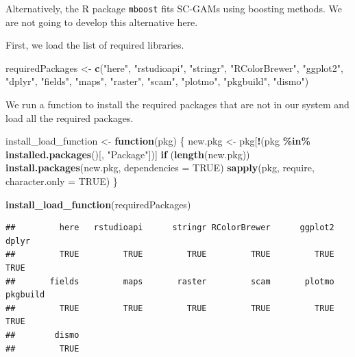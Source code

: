 \documentclass[
]{book}
\newenvironment{Shaded}{\begin{snugshade}}{\end{snugshade}}
\newcommand{\AttributeTok}[1]{\textcolor[rgb]{0.13,0.29,0.53}{#1}}
\newcommand{\ConstantTok}[1]{\textcolor[rgb]{0.56,0.35,0.01}{#1}}
\newcommand{\ControlFlowTok}[1]{\textcolor[rgb]{0.13,0.29,0.53}{\textbf{#1}}}
\newcommand{\FunctionTok}[1]{\textcolor[rgb]{0.13,0.29,0.53}{\textbf{#1}}}
\newcommand{\NormalTok}[1]{#1}
\newcommand{\OtherTok}[1]{\textcolor[rgb]{0.56,0.35,0.01}{#1}}
\newcommand{\SpecialCharTok}[1]{\textcolor[rgb]{0.81,0.36,0.00}{\textbf{#1}}}
\newcommand{\StringTok}[1]{\textcolor[rgb]{0.31,0.60,0.02}{#1}}
\begin{document}
Alternatively, the R package \texttt{mboost} fits SC-GAMs using boosting methods. We are not going to develop this alternative here.

First, we load the list of required libraries.

\begin{Shaded}
\begin{Highlighting}[]
\NormalTok{requiredPackages }\OtherTok{\textless{}{-}} \FunctionTok{c}\NormalTok{(}\StringTok{"here"}\NormalTok{, }\StringTok{"rstudioapi"}\NormalTok{,}
    \StringTok{"stringr"}\NormalTok{, }\StringTok{"RColorBrewer"}\NormalTok{, }\StringTok{"ggplot2"}\NormalTok{,}
    \StringTok{"dplyr"}\NormalTok{, }\StringTok{"fields"}\NormalTok{, }\StringTok{"maps"}\NormalTok{, }\StringTok{"raster"}\NormalTok{,}
    \StringTok{"scam"}\NormalTok{, }\StringTok{"plotmo"}\NormalTok{, }\StringTok{"pkgbuild"}\NormalTok{, }\StringTok{"dismo"}\NormalTok{)}
\end{Highlighting}
\end{Shaded}

We run a function to install the required packages that are not in our system and load all the required packages.

\begin{Shaded}
\begin{Highlighting}[]
\NormalTok{install\_load\_function }\OtherTok{\textless{}{-}} \ControlFlowTok{function}\NormalTok{(pkg) \{}
\NormalTok{    new.pkg }\OtherTok{\textless{}{-}}\NormalTok{ pkg[}\SpecialCharTok{!}\NormalTok{(pkg }\SpecialCharTok{\%in\%} \FunctionTok{installed.packages}\NormalTok{()[,}
        \StringTok{"Package"}\NormalTok{])]}
    \ControlFlowTok{if}\NormalTok{ (}\FunctionTok{length}\NormalTok{(new.pkg))}
        \FunctionTok{install.packages}\NormalTok{(new.pkg, }\AttributeTok{dependencies =} \ConstantTok{TRUE}\NormalTok{)}
    \FunctionTok{sapply}\NormalTok{(pkg, require, }\AttributeTok{character.only =} \ConstantTok{TRUE}\NormalTok{)}
\NormalTok{\}}

\FunctionTok{install\_load\_function}\NormalTok{(requiredPackages)}
\end{Highlighting}
\end{Shaded}

\begin{verbatim}
##         here   rstudioapi      stringr RColorBrewer      ggplot2        dplyr 
##         TRUE         TRUE         TRUE         TRUE         TRUE         TRUE 
##       fields         maps       raster         scam       plotmo     pkgbuild 
##         TRUE         TRUE         TRUE         TRUE         TRUE         TRUE 
##        dismo 
##         TRUE
\end{verbatim}
\end{document}
